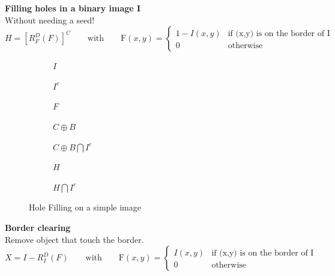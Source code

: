 \textbf{Filling holes in a binary image I}\\
Without needing a seed!\\
\[
	H = [R_F^D(F)]^C  \qquad  \text{with} \qquad \text{F}(x,y)=\begin{cases} 1-I(x,y) & \text{if (x,y) is on the border of I}\\
                                                             0 & \text{otherwise} \end{cases}
\]
\begin{figure}[h!]
\centering
\begin{subfigure}[b]{0.13\textwidth}
\centering
{}
\caption{$I$}
\end{subfigure}
\begin{subfigure}[b]{0.13\textwidth}
\centering
{}
\caption{$I^c$}
\end{subfigure}
\begin{subfigure}[b]{0.13\textwidth}
\centering
{}
\caption{$F$}
\end{subfigure}
\begin{subfigure}[b]{0.13\textwidth}
\centering
{}
\caption{$C \oplus B$}
\end{subfigure}
\begin{subfigure}[b]{0.13\textwidth}
\centering
{}
\caption{$C \oplus B \bigcap I^c$}
\end{subfigure}
\begin{subfigure}[b]{0.13\textwidth}
\centering
{}
\caption{$H$}
\end{subfigure}
\begin{subfigure}[b]{0.13\textwidth}
\centering
{}
\caption{$H \bigcap I^c$}
\end{subfigure}
\caption{Hole Filling on a simple image}
\end{figure}

\textbf{Border clearing}\\
Remove object that touch the border.
\[
X = I-R_I^D(F)  \qquad  \text{with} \qquad \text{F}(x,y)=\begin{cases} I(x,y) & \text{if (x,y) is on the border of I}\\
0 & \text{otherwise} \end{cases}
\]

